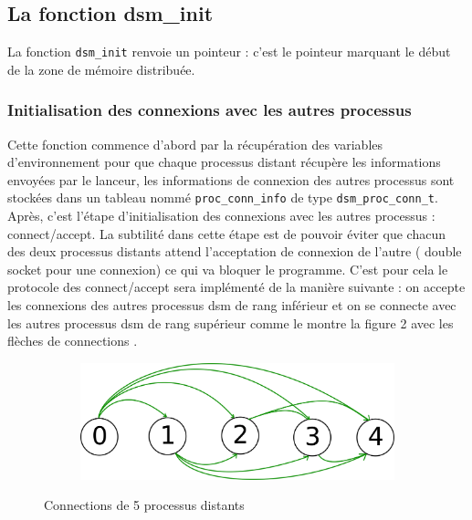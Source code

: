 \subsection{ La fonction dsm\_init}
\setlength{\parindent}{5ex}

La fonction \texttt{dsm\_init} renvoie un pointeur : c’est le pointeur marquant le début de la zone de mémoire distribuée.
\begin{center}
\end{center}

\subsubsection{Initialisation des connexions avec les autres processus}
\setlength{\parindent}{5ex}
Cette fonction commence d'abord par la récupération des variables d'environnement pour que chaque processus distant récupère les informations envoyées par le lanceur, les informations de connexion des autres processus sont stockées dans un tableau nommé \texttt{proc\_conn\_info} de type \texttt{dsm\_proc\_conn\_t}.\\
Après, c'est l'étape d'initialisation des connexions avec les autres processus : connect/accept. La subtilité dans cette étape est de pouvoir éviter que chacun des deux processus distants attend l'acceptation de connexion de l'autre ( double socket pour une connexion) ce qui va bloquer le programme. C'est pour cela le protocole des connect/accept sera implémenté de la manière suivante : on accepte les connexions des autres processus dsm de rang inférieur et on se connecte avec les autres processus dsm de rang supérieur comme le montre la figure 2 avec les flèches de connections .
\begin{figure}[H]
     \centering
     \begin{subfigure}[H]{0.9\textwidth}
         \centering
         \includegraphics[width=\textwidth]{connect_accept.png}
     \end{subfigure}
     \caption{Connections de 5 processus distants}
\end{figure}


